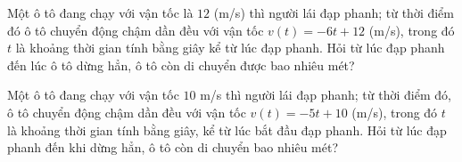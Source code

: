 \begin{ex}%
	Một ô tô đang chạy với vận tốc là $12$ (m/s) thì người lái đạp phanh; từ thời điểm đó ô tô chuyển động chậm dần đều với vận tốc $v \left(t\right) = -6t+12$ (m/s), trong đó $t$ là khoảng thời gian tính bằng giây kể từ lúc đạp phanh. Hỏi từ lúc đạp phanh đến lúc ô tô dừng hẳn, ô tô còn di chuyển được bao nhiêu mét?
\end{ex}

\begin{ex}%
	Một ô tô đang chạy với vận tốc $10$ m/s thì người lái đạp phanh; từ thời điểm đó, ô tô chuyển động chậm dần đều với vận tốc $v \left(t\right) = -5t+10$ (m/s), trong đó $t$ là khoảng thời gian tính bằng giây, kể từ lúc bắt đầu đạp phanh. Hỏi từ lúc đạp phanh đến khi dừng hẳn, ô tô còn di chuyển bao nhiêu mét?
\end{ex}

